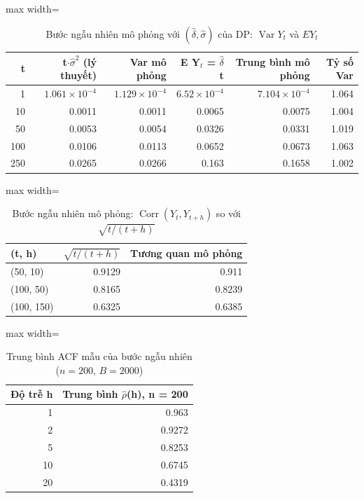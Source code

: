 \begin{table}[H]
\centering\footnotesize
\caption{Bước ngẫu nhiên mô phỏng với $(\hat\delta,\hat\sigma)$ của DP: $\operatorname{Var}Y_t$ và $EY_t$}\label{tab:tab_b12_02_rw_variance}
\begin{adjustbox}{max width=\linewidth}
\begin{tabular}{|r|r|r|r|r|r|}
\toprule
t & t$\cdot\hat{\sigma}^{2}$ (lý thuyết) & Var mô phỏng & E Y$_{t}$ = $\hat{\delta}$t & Trung bình mô phỏng & Tỷ số Var \\
\midrule
1 & $1.061\times10^{-4}$ & $1.129\times10^{-4}$ & $6.52\times10^{-4}$ & $7.104\times10^{-4}$ & 1.064 \\
10 & 0.0011 & 0.0011 & 0.0065 & 0.0075 & 1.004 \\
50 & 0.0053 & 0.0054 & 0.0326 & 0.0331 & 1.019 \\
100 & 0.0106 & 0.0113 & 0.0652 & 0.0673 & 1.063 \\
250 & 0.0265 & 0.0266 & 0.163 & 0.1658 & 1.002 \\
\bottomrule
\end{tabular}
\end{adjustbox}\par{}
\end{table}
\begin{table}[H]
\centering\footnotesize
\caption{Bước ngẫu nhiên mô phỏng: $\operatorname{Corr}(Y_t,Y_{t+h})$ so với $\sqrt{t/(t+h)}$}\label{tab:tab_b12_02_rw_correlation}
\begin{adjustbox}{max width=\linewidth}
\begin{tabular}{|l|r|r|}
\toprule
(t, h) & $\sqrt{t/(t+h)}$ & Tương quan mô phỏng \\
\midrule
(50, 10) & 0.9129 & 0.911 \\
(100, 50) & 0.8165 & 0.8239 \\
(100, 150) & 0.6325 & 0.6385 \\
\bottomrule
\end{tabular}
\end{adjustbox}
\end{table}
\begin{table}[H]
\centering\footnotesize
\caption{Trung bình ACF mẫu của bước ngẫu nhiên ($n=200$, $B=2000$)}\label{tab:tab_b12_02_rw_sample_acf}
\begin{adjustbox}{max width=\linewidth}
\begin{tabular}{|r|r|}
\toprule
Độ trễ h & Trung bình $\hat{\rho}$(h), n = 200 \\
\midrule
1 & 0.963 \\
2 & 0.9272 \\
5 & 0.8253 \\
10 & 0.6745 \\
20 & 0.4319 \\
\bottomrule
\end{tabular}
\end{adjustbox}
\end{table}

